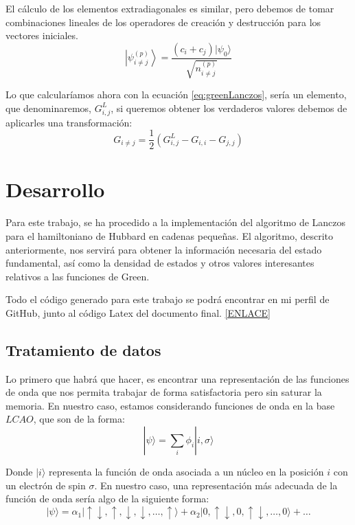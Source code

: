 \documentclass[12pt,twoside]{article}
\begin{document}
El cálculo de los elementos extradiagonales es similar, pero debemos de tomar combinaciones lineales de los operadores de creación y destrucción  para los vectores iniciales.
\begin{equation}
  \left|\psi_{i\neq j}^{(p)}\right\rangle = \frac{\left(c_i + c_j\right)|\psi_0\rangle}{\sqrt{n^{(p)}_{i\neq j}}}
\end{equation}

Lo que calcularíamos ahora con la ecuación \ref{eq:greenLanczos}, sería un elemento, que denominaremos, $G_{i, j}^L$, si queremos obtener los verdaderos valores debemos de aplicarles una transformación:
\begin{equation}
  G_{i\neq j} = \frac{1}{2}\left(G_{i, j}^L - G_{i, i} - G_{j, j}\right)
\end{equation}
\newpage
\section{Desarrollo}

Para este trabajo, se ha procedido a la implementación del algoritmo de Lanczos para el hamiltoniano de Hubbard en cadenas pequeñas. El algoritmo, descrito anteriormente, nos servirá para obtener la información necesaria del estado fundamental, así como la densidad de estados y otros valores interesantes relativos a las funciones de Green.

Todo el código generado para este trabajo se podrá encontrar en mi perfil de GitHub, junto al código Latex del documento final. \href{https://github.com/luisgotsky}{[ENLACE]}
\subsection{Tratamiento de datos}

Lo primero que habrá que hacer, es encontrar una representación de las funciones de onda que nos permita trabajar de forma satisfactoria pero sin saturar la memoria. En nuestro caso, estamos considerando funciones de onda en la base $LCAO$, que son de la forma:
$$
|\psi\rangle = \sum_i \phi_i|i, \sigma\rangle
$$

Donde $|i\rangle$ representa la función de onda asociada a un núcleo en la posición $i$ con un electrón de spin $\sigma$. En nuestro caso, una representación más adecuada de la función de onda sería algo de la siguiente forma:
$$
|\psi\rangle = \alpha_1|\uparrow\downarrow, \uparrow, \downarrow, \downarrow, \ldots, \uparrow\rangle + \alpha_2|0, \uparrow\downarrow, 0, \uparrow\downarrow, \ldots, 0\rangle + \ldots
$$
\end{document}
